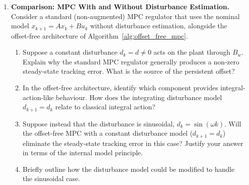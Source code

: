 \begin{enumerate}
	\item \textbf{Comparison: MPC With and Without Disturbance Estimation.}
	Consider a standard (non-augmented) MPC regulator that uses the nominal model \(x_{k+1} = A x_k + B u_k\) without disturbance estimation, alongside the offset-free architecture of Algorithm~\ref{alg:offset_free_mpc}.
	\begin{enumerate}
		\item Suppose a constant disturbance \(d_k = d \neq 0\) acts on the plant through \(B_w\). Explain why the standard MPC regulator generally produces a non-zero steady-state tracking error. What is the source of the persistent offset?
		\item In the offset-free architecture, identify which component provides integral-action-like behaviour. How does the integrating disturbance model \(d_{k+1} = d_k\) relate to classical integral action?
		\item Suppose instead that the disturbance is sinusoidal, \(d_k = \sin(\omega k)\). Will the offset-free MPC with a constant disturbance model (\(d_{k+1} = d_k\)) eliminate the steady-state tracking error in this case? Justify your answer in terms of the internal model principle.
		\item Briefly outline how the disturbance model could be modified to handle the sinusoidal case.
	\end{enumerate}
\end{enumerate}
